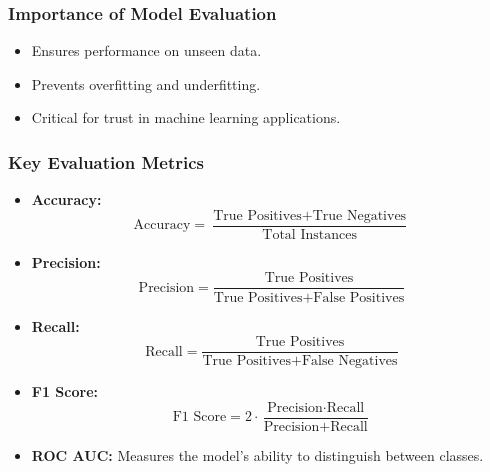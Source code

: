 \documentclass[aspectratio=169]{beamer}
\begin{document}
\begin{frame}[fragile]
  \frametitle{Importance of Model Evaluation}
  \begin{itemize}
    \item Ensures performance on unseen data.
    \item Prevents overfitting and underfitting.
    \item Critical for trust in machine learning applications.
  \end{itemize}
\end{frame}

\begin{frame}[fragile]
  \frametitle{Key Evaluation Metrics}
  \begin{itemize}
    \item \textbf{Accuracy:}
      \begin{equation}
        \text{Accuracy} = \frac{\text{True Positives} + \text{True Negatives}}{\text{Total Instances}}
      \end{equation}
    \item \textbf{Precision:}
      \begin{equation}
        \text{Precision} = \frac{\text{True Positives}}{\text{True Positives} + \text{False Positives}}
      \end{equation}
    \item \textbf{Recall:}
      \begin{equation}
        \text{Recall} = \frac{\text{True Positives}}{\text{True Positives} + \text{False Negatives}}
      \end{equation}
    \item \textbf{F1 Score:}
      \begin{equation}
        \text{F1 Score} = 2 \cdot \frac{\text{Precision} \cdot \text{Recall}}{\text{Precision} + \text{Recall}}
      \end{equation}
    \item \textbf{ROC AUC:} Measures the model's ability to distinguish between classes.
  \end{itemize}
\end{frame}
\end{document}
